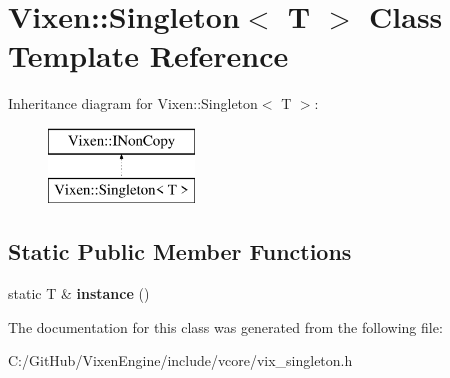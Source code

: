 \hypertarget{class_vixen_1_1_singleton}{}\section{Vixen\+:\+:Singleton$<$ T $>$ Class Template Reference}
\label{class_vixen_1_1_singleton}
Inheritance diagram for Vixen\+:\+:Singleton$<$ T $>$\+:\begin{figure}[H]
\begin{center}
\leavevmode
\includegraphics[height=2.000000cm]{class_vixen_1_1_singleton}
\end{center}
\end{figure}
\subsection*{Static Public Member Functions}
\begin{DoxyCompactItemize}
\item 
\hypertarget{class_vixen_1_1_singleton_a2b64eef896e902ce89a898432c0309fe}{}static T \& {\bfseries instance} ()\label{class_vixen_1_1_singleton_a2b64eef896e902ce89a898432c0309fe}

\end{DoxyCompactItemize}


The documentation for this class was generated from the following file\+:\begin{DoxyCompactItemize}
\item 
C\+:/\+Git\+Hub/\+Vixen\+Engine/include/vcore/vix\+\_\+singleton.\+h\end{DoxyCompactItemize}
